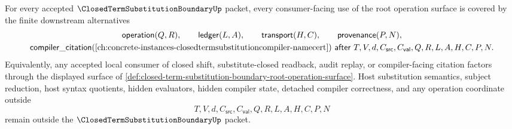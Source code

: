 \begin{theorem}
\label{thm:closed-term-substitution-boundary-root-downstream-coverage}
For every accepted $\ClosedTermSubstitutionBoundaryUp$ packet, every consumer-facing use of the root operation surface is covered by the finite downstream alternatives
$$
\begin{gathered}
\mathsf{operation}(Q,R),\qquad \mathsf{ledger}(L,A),\qquad \mathsf{transport}(H,C),\qquad \mathsf{provenance}(P,N),\\
\mathsf{compiler\_citation}(\autoref{ch:concrete-instances-closedtermsubstitutioncompiler-namecert})\ \mathsf{after}\ T,V,d,C_{\mathsf{src}},C_{\mathsf{val}},Q,R,L,A,H,C,P,N.
\end{gathered}
$$
Equivalently, any accepted local consumer of closed shift, substitute-closed readback, audit replay, or compiler-facing citation factors through the displayed surface of \autoref{def:closed-term-substitution-boundary-root-operation-surface}. Host substitution semantics, subject reduction, host syntax quotients, hidden evaluators, hidden compiler state, detached compiler correctness, and any operation coordinate outside
$$
T,V,d,C_{\mathsf{src}},C_{\mathsf{val}},Q,R,L,A,H,C,P,N
$$
remain outside the $\ClosedTermSubstitutionBoundaryUp$ packet.
\end{theorem}
